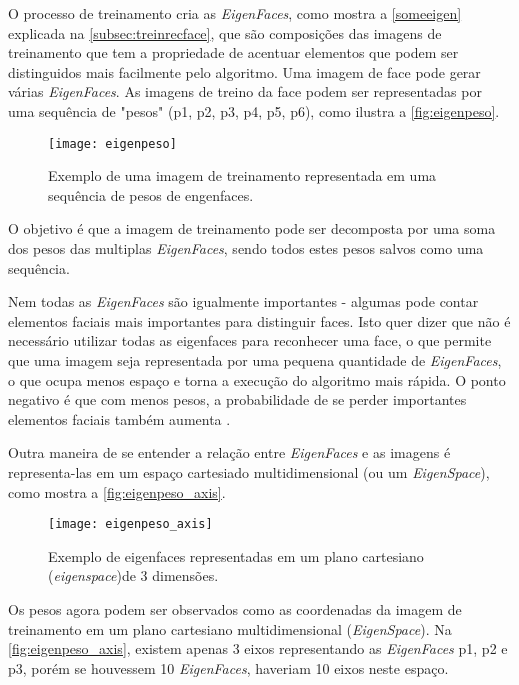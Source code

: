 O processo de treinamento cria as \textit{EigenFaces}, como mostra a \autoref{someeigen} explicada na  \autoref{subsec:treinrecface}, que são composições das imagens de treinamento que tem a propriedade de acentuar elementos que podem ser distinguidos mais facilmente pelo algoritmo. Uma imagem de face pode gerar várias \textit{EigenFaces}. As imagens de treino da face podem ser representadas por uma sequência de "pesos" (p1, p2, p3, p4, p5, p6), como ilustra a \autoref{fig:eigenpeso}.

\begin{figure}[h]
	\centering
	\texttt{[image: eigenpeso]}
	\caption{Exemplo de uma imagem de treinamento representada em uma sequência de pesos de engenfaces.}
	\label{fig:eigenpeso}
\end{figure}

O objetivo é que a imagem de treinamento pode ser decomposta por uma soma dos pesos das multiplas \textit{EigenFaces}, sendo todos estes pesos salvos como uma sequência.

Nem todas as \textit{EigenFaces} são igualmente importantes - algumas pode contar elementos faciais mais importantes para distinguir faces. Isto quer dizer que não é necessário utilizar todas as eigenfaces para reconhecer uma face, o que permite que uma imagem seja representada por uma pequena quantidade de \textit{EigenFaces}, o que ocupa menos espaço e torna a execução do algoritmo mais rápida. O ponto negativo é que com menos pesos, a probabilidade de se perder importantes elementos faciais também aumenta \cite{drmathew_java_programming}.

Outra maneira de se entender a relação entre \textit{EigenFaces} e as imagens é representa-las em um espaço cartesiado multidimensional (ou um \textit{\textit{EigenSpace}}), como mostra a \autoref{fig:eigenpeso_axis}.

\begin{figure}[h]
	\centering
	\texttt{[image: eigenpeso\_axis]}
	\caption{Exemplo de eigenfaces representadas em um plano cartesiano (\textit{eigenspace})de 3 dimensões. }
	\label{fig:eigenpeso_axis}
\end{figure}

Os pesos agora podem ser observados como as coordenadas da imagem de treinamento em um plano cartesiano multidimensional (\textit{EigenSpace}). Na \autoref{fig:eigenpeso_axis}, existem apenas 3 eixos representando as \textit{EigenFaces} p1, p2 e p3, porém se houvessem 10 \textit{EigenFaces}, haveriam 10 eixos neste espaço.

